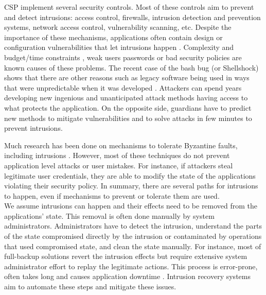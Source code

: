 \acf{CSP} implement several security controls. Most of these controls aim to prevent and detect intrusions: access control, firewalls, intrusion detection and prevention systems, network access control, vulnerability scanning, etc. Despite the importance of these mechanisms, applications often contain design or configuration vulnerabilities that let intrusions happen \cite{Williams2013,Hubbard2010}. Complexity and budget/time constraints \cite{Charette2005}, weak users passwords or bad security policies are known causes of these problems. The recent case of the bash bug (or Shellshock) shows that there are other reasons such as legacy software being used in ways that were unpredictable when it was developed \cite{Sidhpurwala:14}. Attackers can spend years developing new ingenious and unanticipated attack methods having access to what protects the application. On the opposite side, guardians have to predict new methods to mitigate vulnerabilities and to solve attacks in few minutes to prevent intrusions.

Much research has been done on mechanisms to tolerate Byzantine faults, including intrusions \cite{Castro2002,Verissimo2003,Gupta:03}. However, most of these techniques do not prevent application level attacks or user mistakes. For instance, if attackers steal legitimate user credentials, they are able to modify the state of the applications violating their security policy. In summary, there are several paths for intrusions to happen, even if mechanisms to prevent or tolerate them are used.\\ %

We assume intrusions can happen and their effects need to be removed from the applications' state. This removal is often done manually by system administrators. Administrators have to detect the intrusion, understand the parts of the state compromised directly by the intrusion or contaminated by operations that used compromised state, and clean the state manually. For instance, most of full-backup solutions revert the intrusion effects but require extensive system administrator effort to replay the legitimate actions. This process is error-prone, often takes long and causes application downtime \cite{Brown2001}. Intrusion recovery systems aim to automate these steps and mitigate these issues.

